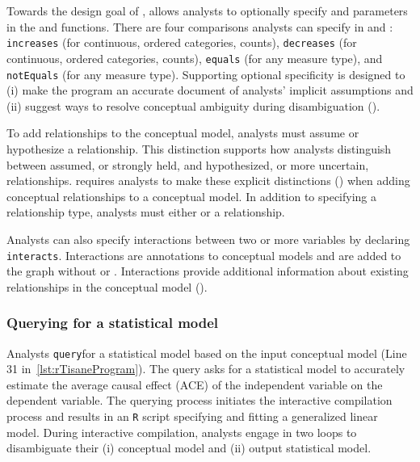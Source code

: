 Towards the design goal of \optionalSpecificity, \rTisane allows analysts to
optionally specify \when and \then parameters in the \causes and \relates
functions. There are four comparisons analysts can specify in
\when and \then: \texttt{increases} (for continuous, ordered categories,
counts), \texttt{decreases} (for continuous, ordered categories, counts),
\texttt{equals} (for any measure type), and \texttt{notEquals} (for any measure
type). Supporting optional specificity is designed to (i) make the \rTisane
program an accurate document of analysts' implicit assumptions and (ii) suggest
ways to resolve conceptual ambiguity during disambiguation
(\considerPossibilities). 

To add relationships to the conceptual model, analysts must assume or
hypothesize a relationship. This distinction supports how analysts distinguish
between assumed, or strongly held, and hypothesized, or more uncertain,
relationships. \rTisane requires analysts to make these explicit distinctions
(\assumeHypothesize) when adding conceptual relationships to a conceptual model.
In addition to specifying a relationship type, analysts must either \assume or
\hypothesize a relationship. 


Analysts can also specify interactions between two or more variables by
declaring \texttt{interacts}. Interactions are annotations to conceptual models
and are added to the graph without \assume or \hypothesize. Interactions provide
additional information about existing relationships in the conceptual model
(\interactionAsPartialSpec). 

\def\query{\texttt{query}\xspace}
\subsubsection{Querying for a statistical model}
Analysts \query \rTisane for a statistical model based on the input conceptual
model (Line 31 in~\autoref{lst:rTisaneProgram}). The query asks for a statistical model to accurately
estimate the average causal effect (ACE) of the independent variable on the
dependent variable. The querying process initiates the interactive compilation
process and results in an \texttt{R} script specifying and fitting a generalized
linear model. During interactive compilation, analysts engage in two loops to
disambiguate their (i) conceptual model and (ii) output statistical model. 

